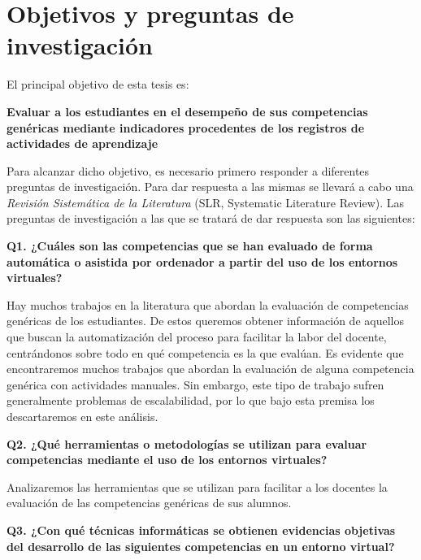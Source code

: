 
\section{Objetivos y preguntas de investigación}
\label{sec:objetivos}

El principal objetivo de esta tesis es:

\bigskip
\textbf{Evaluar a los estudiantes en el desempeño de sus competencias genéricas mediante indicadores procedentes de los registros de actividades de aprendizaje}
\bigskip

Para alcanzar dicho objetivo, es necesario primero responder a diferentes preguntas de investigación. Para dar respuesta a las mismas se llevará a cabo una \emph{Revisión Sistemática de la Literatura} (SLR, Systematic Literature Review). Las preguntas de investigación a las que se tratará de dar respuesta son las siguientes:

\bigskip
\textbf{Q1. ¿Cuáles son las competencias que se han evaluado de forma automática o asistida por ordenador a partir del uso de los entornos virtuales?}
\bigskip

Hay muchos trabajos en la literatura que abordan la evaluación de competencias genéricas de los estudiantes. De estos queremos obtener información de aquellos que buscan la automatización del proceso para facilitar la labor del docente, centrándonos sobre todo en qué competencia es la que evalúan. Es evidente que encontraremos muchos trabajos que abordan la evaluación de alguna competencia genérica con actividades manuales. Sin embargo, este tipo de trabajo sufren generalmente problemas de escalabilidad, por lo que bajo esta premisa los descartaremos en este análisis.

\bigskip
\textbf{Q2. ¿Qué herramientas o metodologías se utilizan para evaluar competencias mediante el uso de los entornos virtuales?}
\bigskip



Analizaremos las herramientas que se utilizan para facilitar a los docentes la evaluación de las competencias genéricas de sus alumnos.

\bigskip
\textbf{Q3. ¿Con qué técnicas informáticas se obtienen evidencias objetivas del {desarrollo} de las siguientes competencias en un entorno virtual?}
\bigskip


